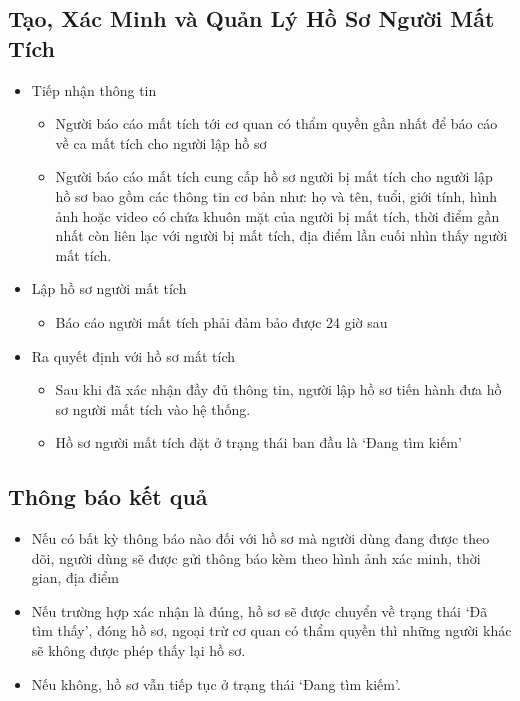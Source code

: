 \documentclass[../DoAn.tex]{subfiles}
\begin{document}
\subsection{Tạo, Xác Minh và Quản Lý Hồ Sơ Người Mất Tích}
\begin{itemize}
	\item Tiếp nhận thông tin
	      \begin{itemize}
		      \item Người báo cáo mất tích tới cơ quan có thẩm quyền gần nhất để báo cáo về ca mất tích cho người lập hồ sơ
		      \item Người báo cáo mất tích cung cấp hồ sơ người bị mất tích cho người lập hồ sơ bao gồm các thông tin cơ bản như: họ và tên, tuổi, giới tính, hình ảnh hoặc video có chứa khuôn mặt của người bị mất tích, thời điểm gần nhất còn liên lạc với người bị mất tích, địa điểm lần cuối nhìn thấy người mất tích.
	      \end{itemize}
	\item Lập hồ sơ người mất tích
	      \begin{itemize}
		      \item Báo cáo người mất tích phải đảm bảo được 24 giờ sau
	      \end{itemize}
	\item Ra quyết định với hồ sơ mất tích
	      \begin{itemize}
		      \item Sau khi đã xác nhận đầy đủ thông tin, người lập hồ sơ tiến hành đưa hồ sơ người mất tích vào hệ thống.
		      \item Hồ sơ người mất tích đặt ở trạng thái ban đầu là ‘Đang tìm kiếm’
	      \end{itemize}
\end{itemize}
\subsection{Thông báo kết quả}
\begin{itemize}
	\item Nếu có bất kỳ thông báo nào đối với hồ sơ mà người dùng đang được theo dõi, người dùng sẽ được gửi thông báo kèm theo hình ảnh xác minh, thời gian, địa điểm
	\item Nếu trường hợp xác nhận là đúng, hồ sơ sẽ được chuyển về trạng thái ‘Đã tìm thấy’, đóng hồ sơ, ngoại trừ cơ quan có thẩm quyền thì những người khác sẽ không được phép thấy lại hồ sơ.
	\item Nếu không, hồ sơ vẫn tiếp tục ở trạng thái ‘Đang tìm kiếm’.
\end{itemize}
\end{document}
